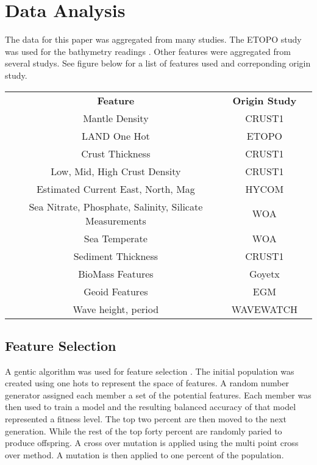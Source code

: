 \section{Data Analysis}
\setlength{\parindent}{10ex}
The data for this paper was aggregated from many studies.
The ETOPO study was used for the bathymetry readings \cite{national1988etopo}.
Other features were aggregated from several studys.
See figure below for a list of features used and correponding origin study. 

\begin{table}[htb]
    \begin{tabular}{ |c|c| p{10cm}}
        \hline
            \textbf{Feature} & \textbf{Origin Study} \\
            Mantle Density & CRUST1 \cite{laske2013update} \\
            LAND One Hot & ETOPO \cite{national1988etopo} \\
            Crust Thickness & CRUST1 \cite{laske2013update} \\
            Low, Mid, High Crust Density & CRUST1 \cite{laske2013update} \\
            Estimated Current East, North, Mag & HYCOM \cite{chassignet2009us} \\
            Sea Nitrate, Phosphate, Salinity, Silicate Measurements & WOA \\
            Sea Temperate & WOA \\
            Sediment Thickness & CRUST1 \cite{laske2013update} \\
            BioMass Features & Goyetx \\
            Geoid Features & EGM \cite{pavlis2008earth} \\
            Wave height, period & WAVEWATCH \cite{tolman20072007} \\
        \hline
    \end{tabular}
\end{table}

\subsection{Feature Selection}
A gentic algorithm was used for feature selection \cite{yang1998feature}.
The initial population was created using one hots to represent the space of features.
A random number generator assigned each member a set of the potential features. 
Each member was then used to train a model and the resulting balanced accuracy of that model represented a fitness level.
The top two percent are then moved to the next generation.
While the rest of the top forty percent are randomly paried to produce offspring.
A cross over mutation is applied using the multi point cross over method.
A mutation is then applied to one percent of the population.

